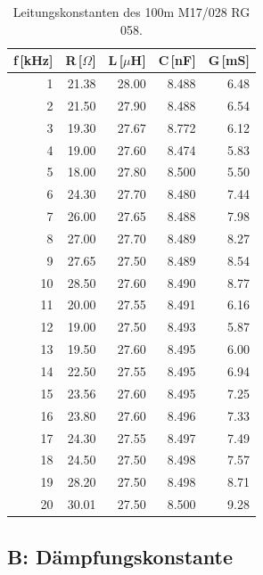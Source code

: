 \begin{table}
\centering
	\caption[]{Leitungskonstanten des 100m M17/028 RG 058.}
	\begin{tabular}{r r r r r}
		f\,[kHz] & R\,[$\Omega$] & L\,[$\mu$H] & C\,[nF] & G\,[mS]\\
		\hline \hline
			  1	&	21.38	&	28.00	&	8.488	&	6.48\\
			  2	&	21.50	&	27.90	&	8.488	&	6.54\\
			  3	&	19.30	&	27.67	&	8.772	&	6.12\\
			  4	&	19.00	&	27.60	&	8.474	&	5.83\\
			  5	&	18.00	&	27.80	&	8.500	&	5.50\\
			  6	&	24.30	&	27.70	&	8.480	&	7.44\\
			  7	&	26.00	&	27.65	&	8.488	&	7.98\\
			  8	&	27.00	&	27.70	&	8.489	&	8.27\\
			  9	&	27.65	&	27.50	&	8.489	&	8.54\\
			 10	&	28.50	&	27.60	&	8.490	&	8.77\\
			 11	&	20.00	&	27.55	&	8.491	&	6.16\\
			 12	&	19.00	&	27.50	&	8.493	&	5.87\\
			 13	&	19.50	&	27.60	&	8.495	&	6.00\\
			 14	&	22.50	&	27.55	&	8.495	&	6.94\\
			 15	&	23.56	&	27.60	&	8.495	&	7.25\\
			 16	&	23.80	&	27.60	&	8.496	&	7.33\\
			 17	&	24.30	&	27.55	&	8.497	&	7.49\\
			 18	&	24.50	&	27.50	&	8.498	&	7.57\\
			 19	&	28.20	&	27.50	&	8.498	&	8.71\\
			 20	&	30.01	&	27.50	&	8.500	&	9.28\\
			\hline
	\end{tabular}
	\label{tab_konst3}
\end{table}

\FloatBarrier
\subsection{B: Dämpfungskonstante} %
\label{sub:b_}

